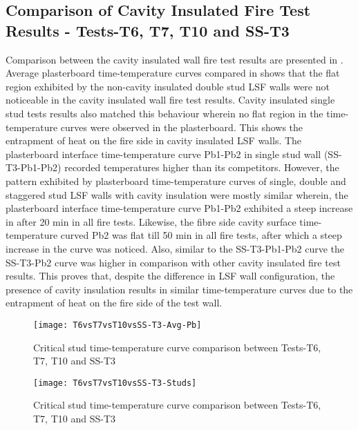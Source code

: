 \subsection{Comparison of Cavity Insulated Fire Test Results - Tests-T6, T7, T10 and SS-T3}

Comparison between the cavity insulated wall fire test results are presented in . Average plasterboard time-temperature curves compared in  shows that the flat region exhibited by the non-cavity insulated double stud LSF walls were not noticeable in the cavity insulated wall fire test results. Cavity insulated single stud tests results also matched this behaviour wherein no flat region in the time-temperature curves were observed in the plasterboard. This shows the entrapment of heat on the fire side in cavity insulated LSF walls. The plasterboard interface time-temperature curve Pb1-Pb2 in single stud wall (SS-T3-Pb1-Pb2) recorded temperatures higher than its competitors. However, the pattern exhibited by plasterboard time-temperature curves of single, double and staggered stud LSF walls with cavity insulation were mostly similar wherein, the plasterboard interface time-temperature curve Pb1-Pb2 exhibited a steep increase in after 20 min in all fire tests. Likewise, the fibre side cavity surface time-temperature curved Pb2 was flat till 50 min in all fire tests, after which a steep increase in the curve was noticed. Also, similar to the SS-T3-Pb1-Pb2 curve the SS-T3-Pb2 curve was higher in comparison with other cavity insulated fire test results. This proves that, despite the difference in LSF wall configuration, the presence of cavity insulation results in similar time-temperature curves due to the entrapment of heat on the fire side of the test wall.
\begin{figure}[!htbp]
	\centering
		\texttt{[image: T6vsT7vsT10vsSS-T3-Avg-Pb]}  
	\caption{Critical stud time-temperature curve comparison between Tests-T6, T7, T10 and SS-T3}
	\label{fig:T6vsT7vsT10vsSS-T3-Avg-Pb}
\end{figure}
\begin{figure}[htbp]
	\centering
		\texttt{[image: T6vsT7vsT10vsSS-T3-Studs]}  
	\caption{Critical stud time-temperature curve comparison between Tests-T6, T7, T10 and SS-T3}
	\label{fig:T6vsT7vsT10vsSS-T3-Studs}
\end{figure}


